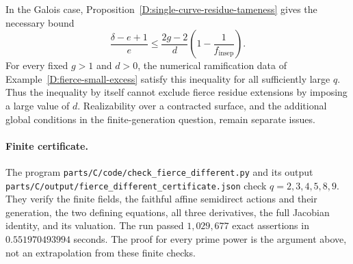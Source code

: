\begin{remark}
In the Galois case, Proposition~\ref{D:single-curve-residue-tameness}
gives the necessary bound
\[
 \frac{\delta-e+1}{e}
   \leq\frac{2g-2}{d}\left(1-\frac1{f_{\mathrm{insep}}}\right).
\]
For every fixed $g>1$ and $d>0$, the numerical ramification data of
Example~\ref{D:fierce-small-excess} satisfy this inequality for all
sufficiently large $q$.  Thus the inequality by itself cannot exclude
fierce residue extensions by imposing a large value of $d$.
Realizability over a contracted surface, and the additional global
conditions in the finite-generation question, remain separate issues.
\end{remark}

\paragraph{Finite certificate.}
The program \nolinkurl{parts/C/code/check_fierce_different.py} and its
output \nolinkurl{parts/C/output/fierce_different_certificate.json}
check $q=2,3,4,5,8,9$.  They verify the finite fields, the faithful affine
semidirect actions and their generation, the two defining equations, all
three derivatives, the full Jacobian identity, and its valuation.
The run passed $1{,}029{,}677$ exact assertions in
$0.551970493994$ seconds.  The proof for every prime power is the argument
above, not an extrapolation from these finite checks.
